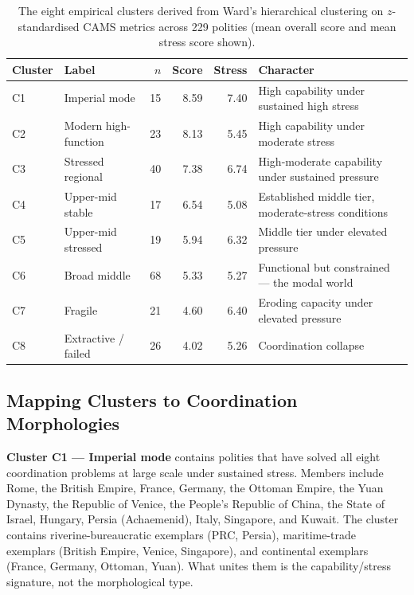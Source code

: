 \documentclass[12pt,a4paper]{article}
\begin{document}
\begin{table}[ht]
\centering
\setlength{\tabcolsep}{8pt}
\renewcommand{\arraystretch}{1.25}
\begin{tabularx}{\textwidth}{l l r r r X}
\toprule
\rowcolor{tablehead}
\textbf{Cluster} & \textbf{Label} & \textbf{$n$} & \textbf{Score} & \textbf{Stress} & \textbf{Character} \\
\midrule
C1 & Imperial mode          & 15 & 8.59 & 7.40 & High capability under sustained high stress \\
C2 & Modern high-function   & 23 & 8.13 & 5.45 & High capability under moderate stress \\
C3 & Stressed regional      & 40 & 7.38 & 6.74 & High-moderate capability under sustained pressure \\
C4 & Upper-mid stable       & 17 & 6.54 & 5.08 & Established middle tier, moderate-stress conditions \\
C5 & Upper-mid stressed     & 19 & 5.94 & 6.32 & Middle tier under elevated pressure \\
C6 & Broad middle           & 68 & 5.33 & 5.27 & Functional but constrained --- the modal world \\
C7 & Fragile                & 21 & 4.60 & 6.40 & Eroding capacity under elevated pressure \\
C8 & Extractive / failed    & 26 & 4.02 & 5.26 & Coordination collapse \\
\bottomrule
\end{tabularx}
\caption{The eight empirical clusters derived from Ward's hierarchical clustering on $z$-standardised CAMS metrics across 229 polities (mean overall score and mean stress score shown).}
\label{tab:clusters}
\end{table}

\subsection{Mapping Clusters to Coordination Morphologies}

\textbf{Cluster C1 --- Imperial mode} contains polities that have solved all eight coordination problems at large scale under sustained stress. Members include Rome, the British Empire, France, Germany, the Ottoman Empire, the Yuan Dynasty, the Republic of Venice, the People's Republic of China, the State of Israel, Hungary, Persia (Achaemenid), Italy, Singapore, and Kuwait. The cluster contains riverine-bureaucratic exemplars (PRC, Persia), maritime-trade exemplars (British Empire, Venice, Singapore), and continental exemplars (France, Germany, Ottoman, Yuan). What unites them is the capability/stress signature, not the morphological type.
\end{document}

